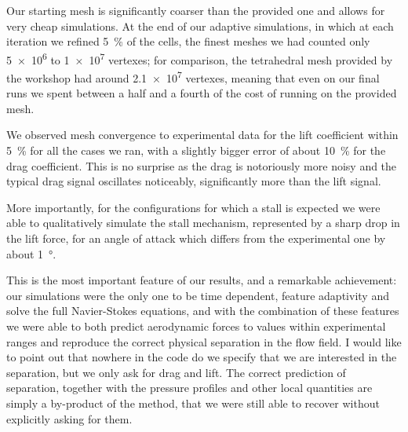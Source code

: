 Our starting mesh is significantly coarser than the provided one and allows for very cheap simulations.
At the end of our adaptive simulations, in which at each iteration we refined \SI{5}{\percent} of the cells, the finest meshes we had counted only \num{5e6} to \num{1e7} vertexes; for comparison, the tetrahedral mesh provided by the workshop had around \num{2.1e7} vertexes, meaning that even on our final runs we spent between a half and a fourth of the cost of running on the provided mesh.

We observed mesh convergence to experimental data for the lift coefficient within \SI{5}{\percent} for all the cases we ran, with a slightly bigger error of about \SI{10}{\percent} for the drag coefficient.
This is no surprise as the drag is notoriously more noisy and the typical drag signal oscillates noticeably, significantly more than the lift signal.

More importantly, for the configurations for which a stall is expected we were able to qualitatively simulate the stall mechanism, represented by a sharp drop in the lift force, for an angle of attack which differs from the experimental one by about \SI{1}{\degree}.

This is the most important feature of our results, and a remarkable achievement: our simulations were the only one to be time dependent, feature adaptivity and solve the full Navier-Stokes equations, and with the combination of these features we were able to both predict aerodynamic forces to values within experimental ranges and reproduce the correct physical separation in the flow field.
I would like to point out that nowhere in the code do we specify that we are interested in the separation, but we only ask for drag and lift.
The correct prediction of separation, together with the pressure profiles and other local quantities are simply a by-product of the method, that we were still able to recover without explicitly asking for them.

